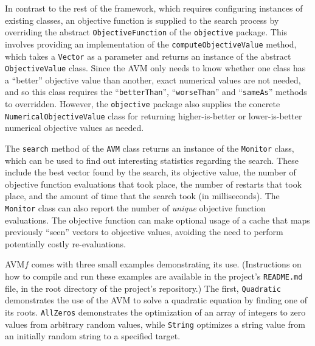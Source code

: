 \documentclass{llncs}
\newcommand{\AVM}{Alternating Variable Method\xspace}
\newcommand{\name}{AVM\hspace{-1pt}$f$\xspace}
\newcommand{\inlineheading}[1]{\vspace{1mm} \noindent {\bf #1.}}
\begin{document}
\begin{sloppypar}
\inlineheading{Objective Function} In contrast to the rest of the framework, which requires configuring instances of existing classes, an objective function is supplied to the search process by overriding the abstract {\tt ObjectiveFunction} of the {\tt objective} package. This involves providing an implementation of the {\tt computeObjectiveValue} method, which takes a {\tt Vector} as a parameter and returns an instance of the abstract {\tt ObjectiveValue} class. Since the AVM only needs to know whether one class has a ``better'' objective value than another, exact numerical values are not needed, and so this class requires the ``{\tt betterThan}'', ``{\tt worseThan}'' and ``{\tt sameAs}'' methods to overridden.
However, the {\tt objective} package also supplies the concrete {\tt NumericalObjectiveValue} class for returning higher-is-better or lower-is-better numerical objective values as needed.
\end{sloppypar}

\begin{sloppypar}
\inlineheading{Reporting} The {\tt search} method of the {\tt AVM} class returns an instance of the {\tt Monitor} class, which can be used to find out interesting statistics regarding the search. These include the best vector found by the search, its objective value, the number of objective function evaluations that took place, the number of restarts that took place, and the amount of time that the search took (in milliseconds). The {\tt Monitor} class can also report the number of {\it unique} objective function evaluations. The objective function can make optional usage of a cache that maps previously ``seen'' vectors to objective values, avoiding the need to perform potentially costly re-evaluations.
\end{sloppypar}

\inlineheading{Examples} \name comes with three small examples demonstrating its use. (Instructions on how to compile and run these examples are available in the project's {\tt README.md} file, in the root directory of the project's repository.) The first, {\tt Quadratic} demonstrates the use of the AVM to solve a quadratic equation by finding one of its roots. {\tt AllZeros} demonstrates the optimization of an array of integers to zero values from arbitrary random values, while {\tt String} optimizes a string value from an initially random string to a specified target.
\end{document}
